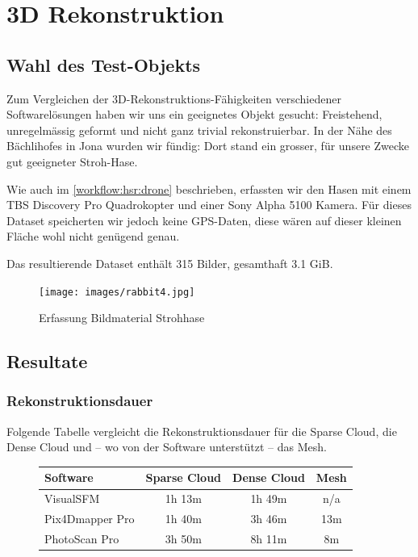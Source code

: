 \chapter{3D Rekonstruktion}

\label{ch:eval-3d}


\section{Wahl des Test-Objekts}

Zum Vergleichen der 3D-Rekonstruktions-Fähigkeiten verschiedener
Softwarelösungen haben wir uns ein geeignetes Objekt gesucht: Freistehend,
unregelmässig geformt und nicht ganz trivial rekonstruierbar. In der Nähe des
Bächlihofes in Jona wurden wir fündig: Dort stand ein grosser, für unsere Zwecke
gut geeigneter Stroh-Hase.

Wie auch im \autoref{workflow:hsr:drone} beschrieben, erfassten wir den Hasen
mit einem TBS Discovery Pro Quadrokopter und einer Sony Alpha 5100 Kamera. Für
dieses Dataset speicherten wir jedoch keine GPS-Daten, diese wären auf dieser
kleinen Fläche wohl nicht genügend genau.

Das resultierende Dataset enthält 315 Bilder, gesamthaft 3.1 GiB.

\begin{figure}[H]
	\centering
	\texttt{[image: images/rabbit4.jpg]}
	\caption{Erfassung Bildmaterial Strohhase}
	\label{img:rabbit4}
\end{figure}


\section{Resultate}

\subsection{Rekonstruktionsdauer}

Folgende Tabelle vergleicht die Rekonstruktionsdauer für die Sparse Cloud, die
Dense Cloud und – wo von der Software unterstützt – das Mesh.

\begin{figure}[H]
	\begin{tabularx}{\textwidth}[H]{Xccc}
		\toprule
		\textbf{Software} & \textbf{Sparse Cloud} & \textbf{Dense Cloud} & \textbf{Mesh} \\
		\midrule
		VisualSFM & 1h 13m & 1h 49m & n/a \\
		Pix4Dmapper Pro & 1h 40m & 3h 46m & 13m \\
		PhotoScan Pro & 3h 50m & 8h 11m & 8m \\
		\bottomrule
	\end{tabularx}
\end{figure}


